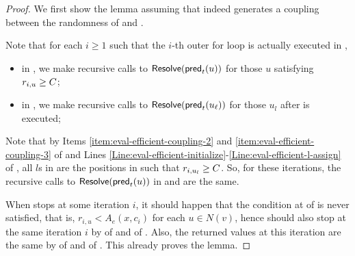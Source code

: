 \begin{proof}
     We first show the lemma assuming that  indeed generates a coupling between the randomness of  and .
     
     Note that for each $i\geq 1$ such that the $i$-th outer for loop is actually executed in ,
     \begin{itemize}
         \item in , we make recursive calls to $\textnormal{\textsf{Resolve}}(\textnormal{\textsf{pred}}_t(u))$ for those $u$ satisfying $r_{i,u}\geq C$;
         \item in , we make recursive calls to $\textnormal{\textsf{Resolve}}(\textnormal{\textsf{pred}}_t(u_{\ell}))$ for those $u_l$ after  is executed;
     \end{itemize}
      Note that by Items \ref{item:eval-efficient-coupling-2} and \ref{item:eval-efficient-coupling-3} of  and Lines \ref{Line:eval-efficient-initialize}-\ref{Line:eval-efficient-l-assign} of , all $l$s in  are the positions in  such that $r_{i,u_l}\geq C$.  So, for these iterations, the recursive calls to $\textnormal{\textsf{Resolve}}(\textnormal{\textsf{pred}}_t(u))$ in  and  are the same.

      When  stops at some iteration $i$, it should happen that the condition at  of  is never satisfied, that is, $r_{i,u}<A_e(x,c_i)$ for each $u\in N(v)$, hence  should also stop at the same iteration $i$ by  of  and  of . Also, the returned values at this iteration are the same by  of  and  of . This already proves the lemma.


\end{proof}
